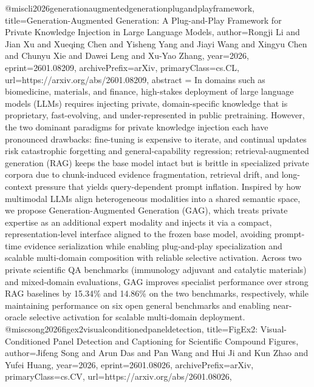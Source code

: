 {}@misc{li2026generationaugmentedgenerationplugandplayframework,
      title={Generation-Augmented Generation: A Plug-and-Play Framework for Private Knowledge Injection in Large Language Models}, 
      author={Rongji Li and Jian Xu and Xueqing Chen and Yisheng Yang and Jiayi Wang and Xingyu Chen and Chunyu Xie and Dawei Leng and Xu-Yao Zhang},
      year={2026},
      eprint={2601.08209},
      archivePrefix={arXiv},
      primaryClass={cs.CL},
      url={https://arxiv.org/abs/2601.08209},
      abstract = {In domains such as biomedicine, materials, and finance, high-stakes deployment of large language models (LLMs) requires injecting private, domain-specific knowledge that is proprietary, fast-evolving, and under-represented in public pretraining. However, the two dominant paradigms for private knowledge injection each have pronounced drawbacks: fine-tuning is expensive to iterate, and continual updates risk catastrophic forgetting and general-capability regression; retrieval-augmented generation (RAG) keeps the base model intact but is brittle in specialized private corpora due to chunk-induced evidence fragmentation, retrieval drift, and long-context pressure that yields query-dependent prompt inflation. Inspired by how multimodal LLMs align heterogeneous modalities into a shared semantic space, we propose Generation-Augmented Generation (GAG), which treats private expertise as an additional expert modality and injects it via a compact, representation-level interface aligned to the frozen base model, avoiding prompt-time evidence serialization while enabling plug-and-play specialization and scalable multi-domain composition with reliable selective activation. Across two private scientific QA benchmarks (immunology adjuvant and catalytic materials) and mixed-domain evaluations, GAG improves specialist performance over strong RAG baselines by 15.34\% and 14.86\% on the two benchmarks, respectively, while maintaining performance on six open general benchmarks and enabling near-oracle selective activation for scalable multi-domain deployment.}
}@misc{song2026figex2visualconditionedpaneldetection,
      title={FigEx2: Visual-Conditioned Panel Detection and Captioning for Scientific Compound Figures}, 
      author={Jifeng Song and Arun Das and Pan Wang and Hui Ji and Kun Zhao and Yufei Huang},
      year={2026},
      eprint={2601.08026},
      archivePrefix={arXiv},
      primaryClass={cs.CV},
      url={https://arxiv.org/abs/2601.08026},
}
